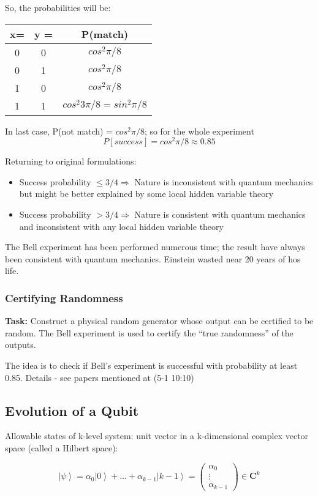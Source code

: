 \documentclass{scrartcl}
\newcommand{\ket}[1]{\left| #1 \right>} %
\begin{document}
So, the probabilities will be:
\begin{tabular}{cc|c}
  \textbf{ x=} & \textbf{ y = } & \textbf{P(match)} \\
  \hline
  0 & 0  & $cos^2 \pi/8$ \\
  0 & 1  & $cos^2 \pi/8$ \\
  1 & 0  & $cos^2 \pi/8$ \\
  1 & 1  & $cos^2 3\pi/8 = sin^2 \pi/8$ \\
\end{tabular}

In last case, P(not match) = $cos^2 \pi / 8$; so for the whole experiment
$$P[success] = cos^2 \pi / 8 \approx 0.85$$

Returning to original formulations:
\begin{itemize}
\item Success probability $\leq 3/4 \Rightarrow$ Nature is inconsistent with
  quantum mechanics but might be better explained by some local hidden variable
  theory
\item Success probability $> 3/4 \Rightarrow$ Nature is consistent with quantum
  mechanics and inconsistent with any local hidden variable theory
\end{itemize}
The Bell experiment has been performed numerous time; the result have always
been consistent with quantum mechanics. Einstein wasted near 20 years of hos
life.

\subsubsection{Certifying Randomness}
\label{sec:5-1}

{\bf Task:} Construct a physical random generator whose output can be certified
to be random. The Bell experiment is used to certify the ``true randomness'' of
the outputs.

The idea is to check if Bell's experiment is successful with probability at
least 0.85. Details - see papers mentioned at (5-1 10:10)

\subsection{Evolution of a Qubit}
\label{sec:5-2}

Allowable states of k-level system: unit vector in a k-dimensional complex
vector space (called a Hilbert space):

\[\ket\psi = \alpha_0\ket0 + \dots + \alpha_{k-1}\ket{k-1} =
\begin{pmatrix} \alpha_0 \\ \vdots \\ \alpha_{k-1} \end{pmatrix} \in
\mathbf{C}^k\]
\end{document}

